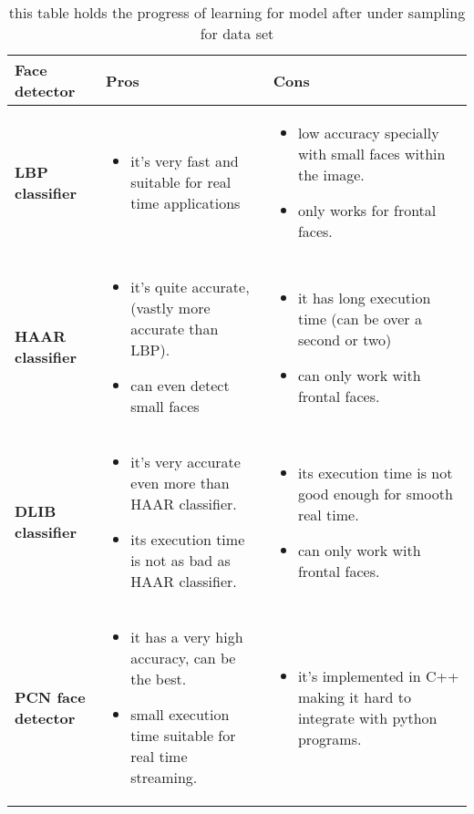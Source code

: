 \begin{table}[h!]
	\centering
	\begin{tabular}{m{3cm} | m{5cm} | m{5cm}}
		\textbf{Face detector} & \textbf{Pros} & \textbf{Cons}\\ \hline 
		\textbf{LBP classifier} 
		&
		\begin{itemize}
			\item it's very fast and suitable for real time applications 
		\end{itemize}

		& 
		\begin{itemize}
			\item low accuracy specially with small faces within the image.
			\item only works for frontal faces.
		\end{itemize}
		\\ \hline
		
		\textbf{HAAR classifier} 
		& 
		\begin{itemize}
			\item it's quite accurate, (vastly more accurate than LBP).
			\item can even detect small faces
		\end{itemize}
		& 
		\begin{itemize}
			\item it has long execution time (can be over a second or two)
			\item can only work with frontal faces.
		\end{itemize} 
		\\ \hline
		
		\textbf{DLIB classifier}
		& 
		\begin{itemize}
			\item it's very accurate even more than HAAR classifier.
			\item its execution time is not as bad as HAAR classifier.
		\end{itemize}
		& 
		\begin{itemize}
			\item its execution time is not good enough for smooth real time.
			\item can only work with frontal faces.
		\end{itemize}
		\\ \hline
		\textbf{PCN face detector }
		& 
		\begin{itemize}
			\item it has a very high accuracy, can be the best.
			\item small execution time suitable for real time streaming.
		\end{itemize} 
		& 
		\begin{itemize}
			\item it's implemented in C++ making it hard to integrate with python programs.
		\end{itemize}
		\\
	\end{tabular}
	\label{tab:facedetectors_compared}
	\caption{this table holds the progress of learning for model after under sampling for data set}
\end{table}
